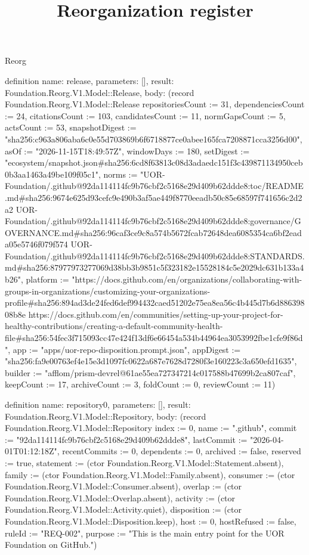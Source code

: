 \begin{lexlean}{Reorg}
\title{Reorganization register}
\begin{semanticmodule}
definition{
  name: release,
  parameters: [],
  result: Foundation.Reorg.V1.Model::Release,
  body: (record Foundation.Reorg.V1.Model::Release {repositoriesCount := 31, dependenciesCount := 24, citationsCount := 103, candidatesCount := 11, normGapsCount := 5, actsCount := 53, snapshotDigest := "sha256:c963a806aba6c0e55d703869b6f6718877ce0abee165fca7208871cca3256d00", asOf := "2026-11-15T18:49:57Z", windowDays := 180, setDigest := "ecosystem/snapshot.json#sha256:6cd8f63813c08d3adaedc151f3c439871134950ceb0b3aa1463a49be109f05c1", norms := "UOR-Foundation/.github@92da114114fc9b76cbf2c5168e29d409b62ddde8:toc/README.md#sha256:9674e625d93cefc9e490b3af5ae449f8770eeadb50c85e68597f741656c2d2a2 UOR-Foundation/.github@92da114114fc9b76cbf2c5168e29d409b62ddde8:governance/GOVERNANCE.md#sha256:96caf3ce9c8a574b5672fcab72648dea6085354ca6bf2eada05e5746f079f574 UOR-Foundation/.github@92da114114fc9b76cbf2c5168e29d409b62ddde8:STANDARDS.md#sha256:87977973277069d38bb3b9851c5f323182e15528184c5e2029dc631b133a4b26", platform := "https://docs.github.com/en/organizations/collaborating-with-groups-in-organizations/customizing-your-organizations-profile#sha256:894ad3de24fed6def994432caed51202e75ea8ea56c4b445d7b6d88639808b8e https://docs.github.com/en/communities/setting-up-your-project-for-healthy-contributions/creating-a-default-community-health-file#sha256:54fec3f715093cc47e424f13df6e66454a534b44964ea3053992fbe1cfe9f86d", app := "apps/uor-repo-disposition.prompt.json", appDigest := "sha256:fa9e00763ef4e15e3d1097fc0622a687e7628d7280f3e160223c3a650efd1635", builder := "afflom/prism-devrel@61ae55ea727347214c017588b47699b2ca807caf", keepCount := 17, archiveCount := 3, foldCount := 0, reviewCount := 11})
}

definition{
  name: repository0,
  parameters: [],
  result: Foundation.Reorg.V1.Model::Repository,
  body: (record Foundation.Reorg.V1.Model::Repository {index := 0, name := ".github", commit := "92da114114fc9b76cbf2c5168e29d409b62ddde8", lastCommit := "2026-04-01T01:12:18Z", recentCommits := 0, dependents := 0, archived := false, reserved := true, statement := (ctor Foundation.Reorg.V1.Model::Statement.absent), family := (ctor Foundation.Reorg.V1.Model::Family.absent), consumer := (ctor Foundation.Reorg.V1.Model::Consumer.absent), overlap := (ctor Foundation.Reorg.V1.Model::Overlap.absent), activity := (ctor Foundation.Reorg.V1.Model::Activity.quiet), disposition := (ctor Foundation.Reorg.V1.Model::Disposition.keep), host := 0, hostRefused := false, ruleId := "REQ-002", purpose := "This is the main entry point for the UOR Foundation on GitHub."})
}


\end{semanticmodule}
\end{lexlean}
